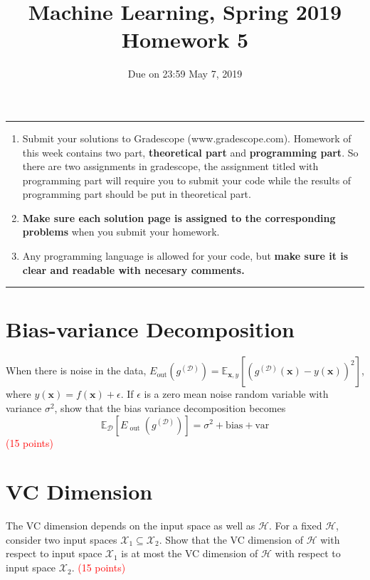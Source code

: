 \documentclass[11pt, nocap, fleqn,a4paper,twoside]{article}
\title{Machine Learning, Spring 2019\\Homework 5}
\date{Due on 23:59 May 7, 2019}
\begin{document}
\maketitle

\noindent
\rule{\linewidth}{0.4pt}
\begin{enumerate}
    \item Submit your solutions to Gradescope (www.gradescope.com).
    Homework of this week contains two part, \textbf{theoretical part} and \textbf{programming part}. So there are two assignments in gradescope, the assignment titled with programming part will require you to submit your code while the results of programming part should be put in theoretical part.
    \item \textbf{Make sure each solution page is assigned to the corresponding problems }when you submit your homework.
    \item
    Any programming language is allowed for your code, but \textbf{make sure it is clear and readable with necesary comments.}
\end{enumerate}

  \noindent
\rule{\linewidth}{0.4pt}

\section{Bias-variance Decomposition}
When there is noise in the data, $E_{\text {out}}\left(g^{(\mathcal{D})}\right)=\mathbb{E}_{\mathbf{x}, y}\left[\left(g^{(\mathcal{D})}(\mathbf{x})-y(\mathbf{x})\right)^{2}\right]$, where $y(\mathbf{x})=f(\mathbf{x})+\epsilon$. If $\epsilon$ is a zero mean noise random variable with variance $\sigma^2$, show that the bias variance decomposition becomes
$$
\mathbb{E}_{\mathcal{D}}\left[E_{\text { out }}\left(g^{(\mathcal{D})}\right)\right]=\sigma^{2}+\text{bias}+\text{var}
$$
\textcolor{red}{(15 points)}

\section{VC Dimension}
The VC dimension depends on the input space as well as $\mathcal{H}$. For a fixed $\mathcal{H}$, consider two input spaces $\mathcal{X}_1 \subseteq \mathcal{X}_2$. Show that the VC dimension of $\mathcal{H}$ with respect to input space  $\mathcal{X}_1$ is at most the VC dimension of $\mathcal{H}$ with respect to input space $\mathcal{X}_2$.
\textcolor{red}{(15 points)}
\end{document}
